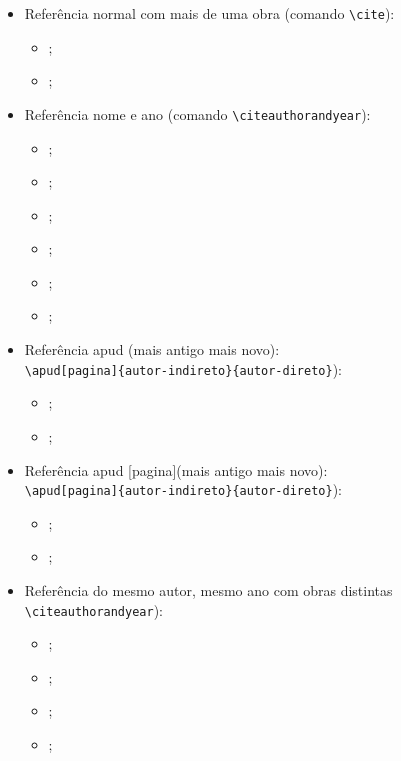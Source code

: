 \begin{itemize}
\begin{itemize}
	\end{itemize}
	\item Referência normal com mais de uma obra (comando \verb|\cite|):
	\begin{itemize}
		\item \cite{Abedi2014, Agaisse1995};
		\item \cite{AgapitoTenfen2014, Baum2016, Nelson2014};
	\end{itemize}
	\item Referência nome e ano (comando \verb|\citeauthorandyear|):
	\begin{itemize}
		\item {};
		\item {};
		\item {};
		\item {};
        \item {};
        \item {};
	\end{itemize}
	\item Referência apud ({mais antigo} {mais novo}):\\
	\verb|\apud[pagina]{autor-indireto}{autor-direto}|):
	\begin{itemize}
		\item {};
		\item {};
	\end{itemize}
	\item Referência apud [pagina]({mais antigo} {mais novo}):\\
	\verb|\apud[pagina]{autor-indireto}{autor-direto}|):
	\begin{itemize}
		\item {};
		\item {};
	\end{itemize}
	
	\item Referência do mesmo autor, mesmo ano com obras distintas 
	\verb|\citeauthorandyear|):
	\begin{itemize}
		\item {};
		\item {};
		\item \cite{Agaisse1996a};
		\item \cite{Agaisse1996b};
	\end{itemize}
	
	
\end{itemize}


